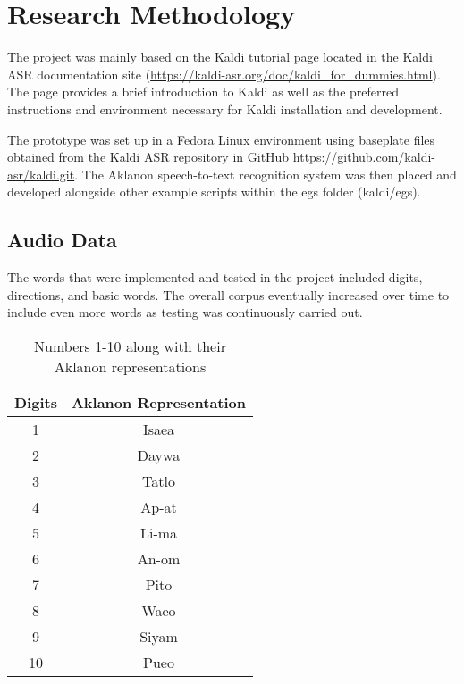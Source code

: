 
\chapter{Research Methodology}

The project was mainly based on the Kaldi tutorial page located in the Kaldi ASR documentation site (\url{https://kaldi-asr.org/doc/kaldi_for_dummies.html}). The page provides a brief introduction to Kaldi as well as the preferred instructions and environment necessary for Kaldi installation and development. 

The prototype was set up in a Fedora Linux environment using baseplate files obtained from the Kaldi ASR repository in GitHub \url{https://github.com/kaldi-asr/kaldi.git}. The Aklanon speech-to-text recognition system was then placed and developed alongside other example scripts within the egs folder (kaldi/egs).

\section{Audio Data}

The words that were implemented and tested in the project included digits, directions, and basic words. The overall corpus eventually increased over time to include even more words as testing was continuously carried out.

\begin{table}
\begin{center}
\begin{tabular}{|c|c|}
\hline
Digits & Aklanon Representation\\
\hline
1 & Isaea\\
\hline
2 & Daywa\\
\hline
3 & Tatlo\\
\hline
4 & Ap-at\\
\hline
5 & Li-ma\\
\hline
6 & An-om\\
\hline
7 & Pito\\
\hline
8 & Waeo\\
\hline
9 & Siyam\\
\hline
10 & Pueo\\
\hline

\end{tabular}{}
\end{center}
\caption{Numbers 1-10 along with their Aklanon representations}
\end{table}

